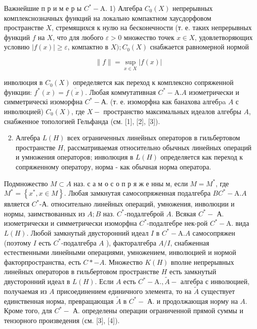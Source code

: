 \documentclass[10pt]{article}
\begin{document}
Важнейшие п р и м е р ы $C^{*}-\mathrm{A}$. 1) Алгебра $C_{0}(X)$ непрерывных комплекснозначных функций на локально компактном хаусдорфовом пространстве $X$, стремящихся к нулю на бесконечности (т. е. таких непрерывных функций $f$ на $X$, что для любого $\varepsilon>0$ множество точек $x \in X$, удовлетворяющих условию $|f(x)| \geqslant \varepsilon$, компактно в $X) ; C_{0}(X)$ снабжается равномерной нормой



\[

\|f\|=\sup _{x \in X}|f(x)|

\]



инволюция в $C_{0}(X)$ определяется как переход к комплексно сопряженной функции: $f^{*}(x)=\overline{f(x)}$. Любая коммутативная $C^{*}-\mathrm{A} . A$ изометрически и симметрическі изоморфна $C^{*}-А$. (т. е. изоморфна как банахова алгебpa $A$ с инволюцией) $C_{0}(X)$, где $X-$ пространство максимальных идеалов алгебры $A$, снабженное топологией Гельфанда (см. [1], [2], [3]).



\begin{enumerate}

  \setcounter{enumi}{1}

  \item Алгебра $L(H)$ всех ограниченных линейных операторов в гильбертовом пространстве $H$, рассматриваемая относительно обычных линейных операций и умножения операторов; инволюция в $L(H)$ определяется как переход к сопряженному оператору, норма - как обычная норма оператора.

\end{enumerate}



Подмножество $M \subset A$ наз. с а м о с о п р я ж е нны м, если $M=M^{*}$, где $M^{*}=\left\{x^{*}, x \in M\right\}$. Любая замкнутая самосопряженная подалгебра $B C^{*}-\mathrm{A} . A$ является $C^{*}$-А. относительно линейных операций, умножения, инволюции и нормы, заимствованных из $A ; B$ наз. $C^{*}$-подалгеброй $A$. Всякая $C^{*}-$ А. изометрически и симметрически изоморфна $C^{*}$-подалгебре нек-рой $C^{*}-\mathrm{A}$. вида $L(H)$. Любой замкнутый двусторонний идеал $I$ в $C^{*}-\mathrm{A} . A$ самосопряжен (поэтому $I$ есть $C^{*}$-подалгебра $A$ ), факторалгебра $A / I$, снабженная естественными линейными операциями, умножением, инволюцией и нормой факторпространства, есть $C *-A$. Множество $K(H)$ вполне непрерывных линейных операторов в гильбертовом пространстве $H$ есть замкнутый двусторонний идеал в $L(H)$. Если $A$ есть $C^{*}-\mathrm{A} ., \tilde{A}-$ алгебра с инволюцией, получаемая из $A$ присоединением единичного элемента, то на $\tilde{A}$ существует единственная норма, превращающая $\tilde{A}$ в $C^{*}-$ А. и продолжающая норму на $A$. Кроме того, для $C^{*}-$ А. определены операции ограниченной прямой суммы и тензорного произведения (см. [3], [4]).
\end{document}
